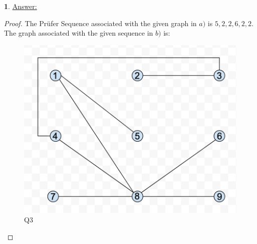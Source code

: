 \documentclass[12pt,a4paper]{article}
\theoremstyle{definition}
\newtheorem{problem}{}
\begin{document}
\begin{problem} \underline{Answer:}
\begin{proof} 
The Pr\"ufer Sequence associated with the given graph in $a)$ is ${5, 2, 2, 6, 2, 2}$. \\

The graph associated with the given sequence in $b)$ is: 
\begin{figure}[H]
    \centering
    \includegraphics[scale=0.5]{q3.png}
    \caption{Q3}
    \label{fig:my_label}
\end{figure}
\end{proof}
\end{problem}
\end{document}

